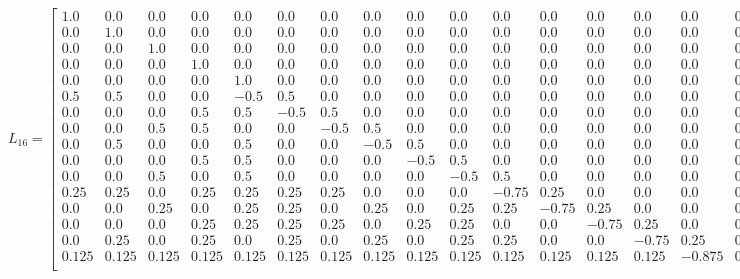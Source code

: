 \documentclass[11pt]{article}
\begin{document}
$$L_{16}=
\left[\begin{smallmatrix}
    1.0 & 0.0 & 0.0 & 0.0 & 0.0 & 0.0 & 0.0 & 0.0 & 0.0 & 0.0 & 0.0 & 0.0 & 0.0 & 0.0 & 0.0 & 0.0 \\
    0.0 & 1.0 & 0.0 & 0.0 & 0.0 & 0.0 & 0.0 & 0.0 & 0.0 & 0.0 & 0.0 & 0.0 & 0.0 & 0.0 & 0.0 & 0.0 \\
    0.0 & 0.0 & 1.0 & 0.0 & 0.0 & 0.0 & 0.0 & 0.0 & 0.0 & 0.0 & 0.0 & 0.0 & 0.0 & 0.0 & 0.0 & 0.0 \\
    0.0 & 0.0 & 0.0 & 1.0 & 0.0 & 0.0 & 0.0 & 0.0 & 0.0 & 0.0 & 0.0 & 0.0 & 0.0 & 0.0 & 0.0 & 0.0 \\
    0.0 & 0.0 & 0.0 & 0.0 & 1.0 & 0.0 & 0.0 & 0.0 & 0.0 & 0.0 & 0.0 & 0.0 & 0.0 & 0.0 & 0.0 & 0.0 \\
    0.5 & 0.5 & 0.0 & 0.0 & -0.5 & 0.5 & 0.0 & 0.0 & 0.0 & 0.0 & 0.0 & 0.0 & 0.0 & 0.0 & 0.0 & 0.0 \\
    0.0 & 0.0 & 0.0 & 0.5 & 0.5 & -0.5 & 0.5 & 0.0 & 0.0 & 0.0 & 0.0 & 0.0 & 0.0 & 0.0 & 0.0 & 0.0 \\
    0.0 & 0.0 & 0.5 & 0.5 & 0.0 & 0.0 & -0.5 & 0.5 & 0.0 & 0.0 & 0.0 & 0.0 & 0.0 & 0.0 & 0.0 & 0.0 \\
    0.0 & 0.5 & 0.0 & 0.0 & 0.5 & 0.0 & 0.0 & -0.5 & 0.5 & 0.0 & 0.0 & 0.0 & 0.0 & 0.0 & 0.0 & 0.0 \\
    0.0 & 0.0 & 0.0 & 0.5 & 0.5 & 0.0 & 0.0 & 0.0 & -0.5 & 0.5 & 0.0 & 0.0 & 0.0 & 0.0 & 0.0 & 0.0 \\
    0.0 & 0.0 & 0.5 & 0.0 & 0.5 & 0.0 & 0.0 & 0.0 & 0.0 & -0.5 & 0.5 & 0.0 & 0.0 & 0.0 & 0.0 & 0.0 \\
    0.25 & 0.25 & 0.0 & 0.25 & 0.25 & 0.25 & 0.25 & 0.0 & 0.0 & 0.0 & -0.75 & 0.25 & 0.0 & 0.0 & 0.0 & 0.0 \\
    0.0 & 0.0 & 0.25 & 0.0 & 0.25 & 0.25 & 0.0 & 0.25 & 0.0 & 0.25 & 0.25 & -0.75 & 0.25 & 0.0 & 0.0 & 0.0 \\
    0.0 & 0.0 & 0.0 & 0.25 & 0.25 & 0.25 & 0.25 & 0.0 & 0.25 & 0.25 & 0.0 & 0.0 & -0.75 & 0.25 & 0.0 & 0.0 \\
    0.0 & 0.25 & 0.0 & 0.25 & 0.0 & 0.25 & 0.0 & 0.25 & 0.0 & 0.25 & 0.25 & 0.0 & 0.0 & -0.75 & 0.25 & 0.0 \\
    0.125 & 0.125 & 0.125 & 0.125 & 0.125 & 0.125 & 0.125 & 0.125 & 0.125 & 0.125 & 0.125 & 0.125 & 0.125 & 0.125 & -0.875 & 0.125\\
\end{smallmatrix}\right].
$$

\end{document}
